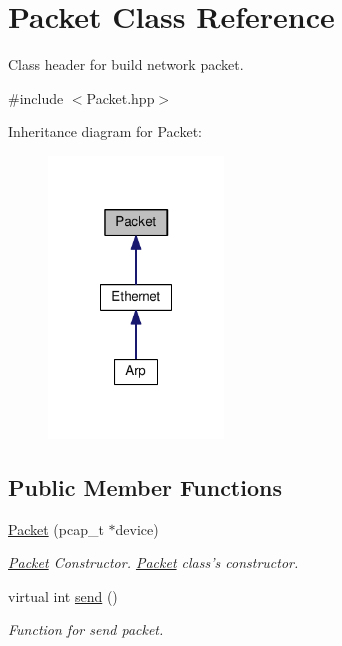 \hypertarget{class_packet}{\section{Packet Class Reference}
\label{class_packet}
}


Class header for build network packet.  




{\ttfamily \#include $<$Packet.\-hpp$>$}



Inheritance diagram for Packet\-:\nopagebreak
\begin{figure}[H]
\begin{center}
\leavevmode
\includegraphics[width=132pt]{class_packet__inherit__graph}
\end{center}
\end{figure}
\subsection*{Public Member Functions}
\begin{DoxyCompactItemize}
\item 
\hyperlink{class_packet_ab3787246de4ff026540b4f1fd91069d9}{Packet} (pcap\-\_\-t $\ast$device)
\begin{DoxyCompactList}\small\item\em \hyperlink{class_packet}{Packet} Constructor. \hyperlink{class_packet}{Packet} class's constructor. \end{DoxyCompactList}\item 
virtual int \hyperlink{class_packet_aaa29e94af4309658a1244c81f4651b1a}{send} ()
\begin{DoxyCompactList}\small\item\em Function for send packet. \end{DoxyCompactList}\end{DoxyCompactItemize}
